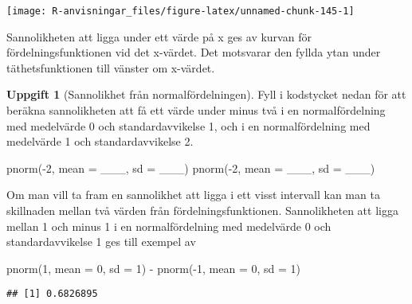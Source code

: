 \documentclass[
]{book}
\newenvironment{Shaded}{\begin{snugshade}}{\end{snugshade}}
\newcommand{\AttributeTok}[1]{\textcolor[rgb]{0.77,0.63,0.00}{#1}}
\newcommand{\DecValTok}[1]{\textcolor[rgb]{0.00,0.00,0.81}{#1}}
\newcommand{\FunctionTok}[1]{\textcolor[rgb]{0.00,0.00,0.00}{#1}}
\newcommand{\NormalTok}[1]{#1}
\newcommand{\SpecialCharTok}[1]{\textcolor[rgb]{0.00,0.00,0.00}{#1}}
\theoremstyle{definition}
\theoremstyle{definition}
\theoremstyle{definition}
\newtheorem{exercise}{Uppgift}[chapter]
\theoremstyle{definition}
\theoremstyle{remark}
\begin{document}
\begin{center}\texttt{[image: R-anvisningar\_files/figure-latex/unnamed-chunk-145-1]} \end{center}

Sannolikheten att ligga under ett värde på x ges av kurvan för fördelningsfunktionen vid det x-värdet. Det motsvarar den fyllda ytan under täthetsfunktionen till vänster om x-värdet.

\begin{exercise}[Sannolikhet från normalfördelningen]

Fyll i kodstycket nedan för att beräkna sannolikheten att få ett värde under minus två i en normalfördelning med medelvärde 0 och standardavvikelse 1, och i en normalfördelning med medelvärde 1 och standardavvikelse 2.

\begin{Shaded}
\begin{Highlighting}[]
\FunctionTok{pnorm}\NormalTok{(}\SpecialCharTok{{-}}\DecValTok{2}\NormalTok{, }\AttributeTok{mean =}\NormalTok{ \_\_\_, }\AttributeTok{sd =}\NormalTok{ \_\_\_)}
\FunctionTok{pnorm}\NormalTok{(}\SpecialCharTok{{-}}\DecValTok{2}\NormalTok{, }\AttributeTok{mean =}\NormalTok{ \_\_\_, }\AttributeTok{sd =}\NormalTok{ \_\_\_)}
\end{Highlighting}
\end{Shaded}

\end{exercise}

Om man vill ta fram en sannolikhet att ligga i ett visst intervall kan man ta skillnaden mellan två värden från fördelningsfunktionen. Sannolikheten att ligga mellan 1 och minus 1 i en normalfördelning med medelvärde 0 och standardavvikelse 1 ges till exempel av

\begin{Shaded}
\begin{Highlighting}[]
\FunctionTok{pnorm}\NormalTok{(}\DecValTok{1}\NormalTok{, }\AttributeTok{mean =} \DecValTok{0}\NormalTok{, }\AttributeTok{sd =} \DecValTok{1}\NormalTok{) }\SpecialCharTok{{-}} \FunctionTok{pnorm}\NormalTok{(}\SpecialCharTok{{-}}\DecValTok{1}\NormalTok{, }\AttributeTok{mean =} \DecValTok{0}\NormalTok{, }\AttributeTok{sd =} \DecValTok{1}\NormalTok{)}
\end{Highlighting}
\end{Shaded}

\begin{verbatim}
## [1] 0.6826895
\end{verbatim}
\end{document}
